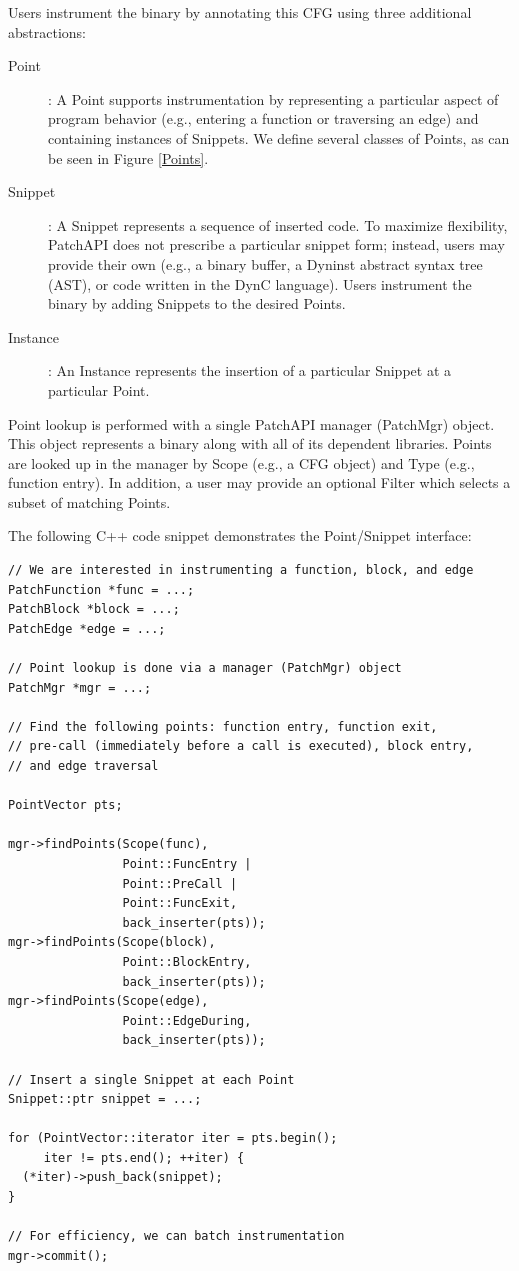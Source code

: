 \documentclass[11pt]{article}
\begin{document}
Users instrument the binary by annotating this CFG using three
additional abstractions:
\begin{description}
\item[Point]: A Point supports instrumentation by representing a
  particular aspect of program behavior (e.g., entering a function or
  traversing an edge) and containing instances of Snippets. We define
  several classes of Points, as can be seen in Figure \ref{Points}.
\item[Snippet]: A Snippet represents a sequence of inserted code. To
  maximize flexibility, PatchAPI does not prescribe a particular
  snippet form; instead, users may provide their own (e.g., a binary
  buffer, a Dyninst abstract syntax tree (AST), or code written in the
  DynC language). Users instrument the binary by adding Snippets to
  the desired Points. 
\item[Instance]: An Instance represents the insertion of a particular
  Snippet at a particular Point.
\end{description}

Point lookup is performed with a single PatchAPI manager (PatchMgr)
object. This object represents a binary along with all of its
dependent libraries. Points are looked up in the manager by Scope
(e.g., a CFG object) and Type (e.g., function entry). In addition, a
user may provide an optional Filter which selects a subset of matching
Points.

The following C++ code snippet demonstrates the Point/Snippet
interface:

\begin{verbatim}
// We are interested in instrumenting a function, block, and edge
PatchFunction *func = ...;
PatchBlock *block = ...;
PatchEdge *edge = ...;

// Point lookup is done via a manager (PatchMgr) object
PatchMgr *mgr = ...;

// Find the following points: function entry, function exit,
// pre-call (immediately before a call is executed), block entry,
// and edge traversal

PointVector pts;

mgr->findPoints(Scope(func),
                Point::FuncEntry | 
                Point::PreCall | 
                Point::FuncExit,
                back_inserter(pts));
mgr->findPoints(Scope(block),
                Point::BlockEntry,
                back_inserter(pts));
mgr->findPoints(Scope(edge),
                Point::EdgeDuring,
                back_inserter(pts));

// Insert a single Snippet at each Point
Snippet::ptr snippet = ...;

for (PointVector::iterator iter = pts.begin(); 
     iter != pts.end(); ++iter) {
  (*iter)->push_back(snippet);
}

// For efficiency, we can batch instrumentation
mgr->commit();

\end{verbatim}
\end{document}
